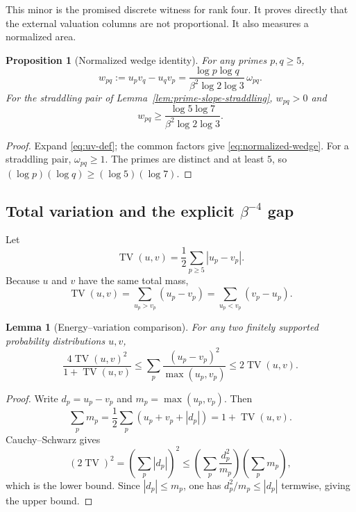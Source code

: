 \documentclass[11pt,oneside]{article}
\theoremstyle{research}
\newtheorem{proposition}[theorem]{Proposition}
\newtheorem{lemma}[theorem]{Lemma}
\theoremstyle{definition}
\newcommand{\TV}{\operatorname{TV}}
\newcommand{\defeq}{\mathrel{:=}}
\begin{document}
This minor is the promised discrete witness for rank four.  It proves directly
that the external valuation columns are not proportional.  It also measures a
normalized area.

\begin{proposition}[Normalized wedge identity]
\label{prop:normalized-wedge}
For any primes $p,q\ge5$,
\begin{equation}
 w_{pq}\defeq u_pv_q-u_qv_p
 =\frac{\log p\log q}{\beta^2\log2\log3}\,\omega_{pq}.
 \label{eq:normalized-wedge}
\end{equation}
For the straddling pair of Lemma~\ref{lem:prime-slope-straddling},
$w_{pq}>0$ and
\begin{equation}
 w_{pq}\ge
 \frac{\log5\log7}{\beta^2\log2\log3}.
 \label{eq:wedge-lower}
\end{equation}
\end{proposition}

\begin{proof}
Expand \eqref{eq:uv-def}; the common factors give
\eqref{eq:normalized-wedge}.  For a straddling pair,
$\omega_{pq}\ge1$.  The primes are distinct and at least $5$, so
$(\log p)(\log q)\ge(\log5)(\log7)$.
\end{proof}

\subsection{Total variation and the explicit $\beta^{-4}$ gap}

Let
\begin{equation}
 \TV(u,v)=\frac12\sum_{p\ge5}|u_p-v_p|.
 \label{eq:tv-def}
\end{equation}
Because $u$ and $v$ have the same total mass,
\begin{equation}
 \TV(u,v)
 =\sum_{u_p>v_p}(u_p-v_p)
 =\sum_{u_p<v_p}(v_p-u_p).
 \label{eq:tv-positive-negative}
\end{equation}

\begin{lemma}[Energy--variation comparison]
\label{lem:energy-tv}
For any two finitely supported probability distributions $u,v$,
\begin{equation}
 \frac{4\TV(u,v)^2}{1+\TV(u,v)}
 \le \sum_p\frac{(u_p-v_p)^2}{\max(u_p,v_p)}
 \le 2\TV(u,v).
 \label{eq:energy-tv}
\end{equation}
\end{lemma}

\begin{proof}
Write $d_p=u_p-v_p$ and $m_p=\max(u_p,v_p)$.  Then
\[
 \sum_p m_p
 =\frac12\sum_p(u_p+v_p+|d_p|)
 =1+\TV(u,v).
\]
Cauchy--Schwarz gives
\[
 (2\TV)^2
 =\left(\sum_p|d_p|\right)^2
 \le\left(\sum_p\frac{d_p^2}{m_p}\right)
    \left(\sum_pm_p\right),
\]
which is the lower bound.  Since $|d_p|\le m_p$, one has
$d_p^2/m_p\le|d_p|$ termwise, giving the upper bound.
\end{proof}
\end{document}
